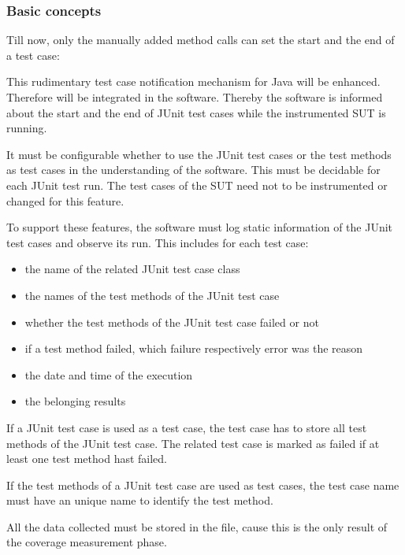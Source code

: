 \subsubsection{Basic concepts}
Till now, only the manually added method calls can set the start and the end of a test case:
\begin{quote}
\end{quote}
\par
This rudimentary test case notification mechanism for Java will be enhanced. Therefore  will be integrated in the software. Thereby the software is informed about the start and the end of JUnit test cases while the instrumented SUT is running.
\par
It must be configurable whether to use the JUnit test cases or the test methods as test cases in the understanding of the software. This must be decidable for each JUnit test run. The test cases of the SUT need not to be instrumented or changed for this feature.
\par
To support these features, the software must log static information of the JUnit test cases and observe its run. This includes for each test case:
\begin{itemize}
  \item the name of the related JUnit test case class
  \item the names of the test methods of the JUnit test case
  \item whether the test methods of the JUnit test case failed or not
  \item if a test method failed, which failure respectively error was the reason
  \item the date and time of the execution
  \item the belonging  results
\end{itemize}
\par 
If a JUnit test case is used as a test case, the test case has to store all test methods of the JUnit test case. The related test case is marked as failed if at least one test method hast failed.
\par
If the test methods of a JUnit test case are used as test cases, the test case name must have an unique name to identify the test method.
\par
All the data collected must be stored in the  file, cause this is the only result of the coverage measurement phase.

